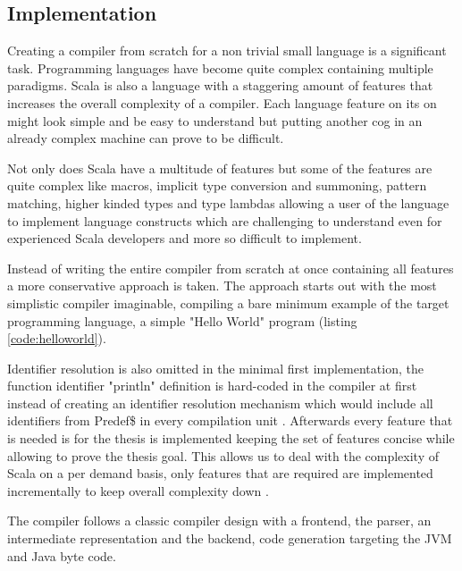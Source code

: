 \documentclass{VUMIFPSbakalaurinis}
\begin{document}
\subsection{Implementation}
Creating a compiler from scratch for a non trivial small language is a significant task.
Programming languages have become quite complex containing multiple paradigms.
Scala is also a language with a staggering amount of features that increases the overall complexity of a compiler.
Each language feature on its on might look simple and be easy to understand but putting another cog in an already complex machine can prove to be difficult.

Not only does Scala have a multitude of features but some of the features are quite complex like macros, implicit type conversion and summoning, pattern matching, higher kinded types and type lambdas allowing a user of the language to implement language constructs \cite{Scala2Union, ShapelessGithub} which are challenging to understand even for experienced Scala developers and more so difficult to implement.

Instead of writing the entire compiler from scratch at once containing all features a more conservative approach is taken.
The approach starts out with the most simplistic compiler imaginable, compiling a bare minimum example of the target programming language, a simple "Hello World" program (listing \ref{code:helloworld}).



Identifier resolution is also omitted in the minimal first implementation, the function identifier "println" definition is hard-coded in the compiler at first instead of creating an identifier resolution mechanism which would include all identifiers from Predef\$ in every compilation unit \cite{Predef}.
Afterwards every feature that is needed is for the thesis is implemented keeping the set of features concise while allowing to prove the thesis goal.
This allows us to deal with the complexity of Scala on a per demand basis, only features that are required are implemented incrementally to keep overall complexity down \cite{IncrementalCompiler}.

The compiler follows a classic compiler design with a frontend, the parser, an intermediate representation and the backend, code generation targeting the JVM and Java byte code.
\end{document}
